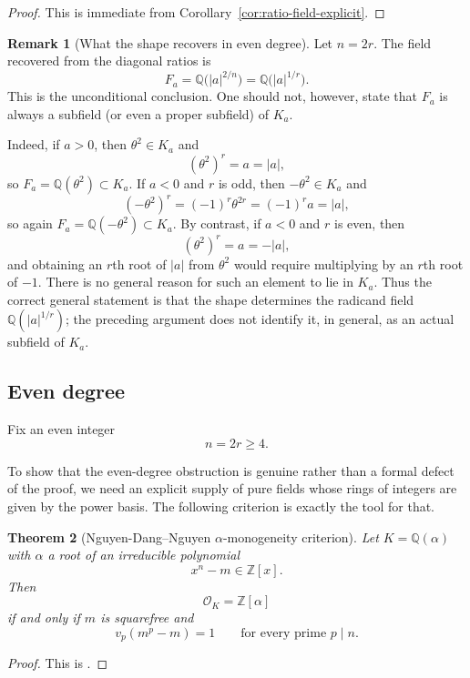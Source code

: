 \documentclass[11pt,letterpaper]{amsart}
\newcommand{\Q}{\mathbb{Q}}
\newcommand{\Z}{\mathbb{Z}}
\newcommand{\cO}{\mathcal{O}}
\theoremstyle{plain}
\newtheorem{theorem}{Theorem}[section]
\theoremstyle{definition}
\newtheorem{remark}[theorem]{Remark}
\begin{document}
\begin{proof}
This is immediate from Corollary~\ref{cor:ratio-field-explicit}.
\end{proof}

\begin{remark}[What the shape recovers in even degree]\label{rem:even-obstruction}
Let $n=2r$.
The field recovered from the diagonal ratios is
\[
F_a=\Q\bigl(|a|^{2/n}\bigr)=\Q\bigl(|a|^{1/r}\bigr).
\]
This is the unconditional conclusion.
One should not, however, state that $F_a$ is always a subfield (or even a proper subfield) of $K_a$.

Indeed, if $a>0$, then $\theta^2\in K_a$ and
\[
(\theta^2)^r=a=|a|,
\]
so $F_a=\Q(\theta^2)\subset K_a$.
If $a<0$ and $r$ is odd, then $-\theta^2\in K_a$ and
\[
(-\theta^2)^r=(-1)^r\theta^{2r}=(-1)^r a=|a|,
\]
so again $F_a=\Q(-\theta^2)\subset K_a$.
By contrast, if $a<0$ and $r$ is even, then
\[
(\theta^2)^r=a=-|a|,
\]
and obtaining an $r$th root of $|a|$ from $\theta^2$ would require multiplying by an $r$th root of $-1$.
There is no general reason for such an element to lie in $K_a$.
Thus the correct general statement is that the shape determines the radicand field
$\Q(|a|^{1/r})$; the preceding argument does not identify it, in general, as an actual subfield of $K_a$.
\end{remark}



\subsection{Even degree}
\label{subsec:even-sign-squarefree}

Fix an even integer
\[
n=2r\ge 4.
\]

To show that the even-degree obstruction is genuine rather than a formal defect of the proof, we need an explicit supply of pure fields whose rings of integers are given by the power basis. The following criterion is exactly the tool for that.


\begin{theorem}[Nguyen-Dang--Nguyen \(\alpha\)-monogeneity criterion]
\label{thm:NDH-monogenic}
Let \(K=\Q(\alpha)\) with \(\alpha\) a root of an irreducible polynomial
\[
x^n-m\in \Z[x].
\]
Then
\[
\cO_K=\Z[\alpha]
\]
if and only if \(m\) is squarefree and
\[
v_p(m^p-m)=1
\qquad\text{for every prime }p\mid n.
\]
\end{theorem}

\begin{proof}
This is \cite[Theorem~2.7]{NguyenDangHung2025Alpha}.
\end{proof}
\end{document}

